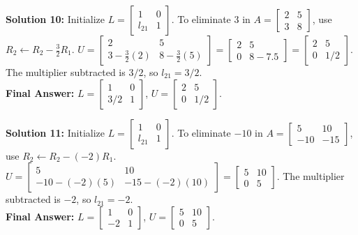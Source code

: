 \documentclass[11pt]{article}
\begin{document}
\vspace{0.5cm}
\textbf{Solution 10:}
Initialize $L = \begin{bmatrix} 1 & 0 \\ l_{21} & 1 \end{bmatrix}$.
To eliminate $3$ in $A = \begin{bmatrix} 2 & 5 \\ 3 & 8 \end{bmatrix}$, use $R_2 \leftarrow R_2 - \frac{3}{2}R_1$.
$U = \begin{bmatrix} 2 & 5 \\ 3 - \frac{3}{2}(2) & 8 - \frac{3}{2}(5) \end{bmatrix} = \begin{bmatrix} 2 & 5 \\ 0 & 8 - 7.5 \end{bmatrix} = \begin{bmatrix} 2 & 5 \\ 0 & 1/2 \end{bmatrix}$.
The multiplier subtracted is $3/2$, so $l_{21} = 3/2$. \\
\textbf{Final Answer:} $L = \begin{bmatrix} 1 & 0 \\ 3/2 & 1 \end{bmatrix}$, $U = \begin{bmatrix} 2 & 5 \\ 0 & 1/2 \end{bmatrix}$.

\vspace{0.5cm}
\textbf{Solution 11:}
Initialize $L = \begin{bmatrix} 1 & 0 \\ l_{21} & 1 \end{bmatrix}$.
To eliminate $-10$ in $A = \begin{bmatrix} 5 & 10 \\ -10 & -15 \end{bmatrix}$, use $R_2 \leftarrow R_2 - (-2)R_1$.
$U = \begin{bmatrix} 5 & 10 \\ -10 - (-2)(5) & -15 - (-2)(10) \end{bmatrix} = \begin{bmatrix} 5 & 10 \\ 0 & 5 \end{bmatrix}$.
The multiplier subtracted is $-2$, so $l_{21} = -2$. \\
\textbf{Final Answer:} $L = \begin{bmatrix} 1 & 0 \\ -2 & 1 \end{bmatrix}$, $U = \begin{bmatrix} 5 & 10 \\ 0 & 5 \end{bmatrix}$.
\end{document}
